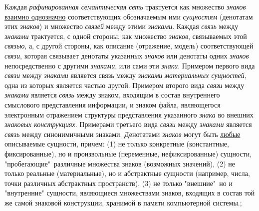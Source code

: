 \begin{SCn}
{{\newline
Каждая \textit{рафинированная семантическая сеть} трактуется как множество \textit{знаков} \uline{взаимно однозначно} соответствующих обозначаемым ими \textit{сущностям} (денотатам этих \textit{знаков}) и множество \textit{связей} между этими \textit{знаками}.
\newline
Каждая \textit{связь} между \textit{знаками} трактуется, с одной стороны, как множество \textit{знаков}, связываемых этой \textit{связью}, а, с другой стороны, как описание (отражение, модель) соответствующей \textit{связи}, которая связывает денотаты указанных \textit{знаков} или денотаты одних \textit{знаков} непосредственно с другими \textit{знаками}, или сами эти \textit{знаки}. Примером первого вида \textit{связи} между \textit{знаками} является связь между \textit{знаками} \textit{материальных сущностей}, одна из которых является частью другой. Примером второго вида \textit{связи} между \textit{знаками} является \textit{связь} между знаком, входящим в состав внутреннего смыслового представления информации, и знаком файла, являющегося электронным отражением структуры представления указанного \textit{знака} во внешних \textit{знаковых конструкциях}. Примерами третьего вида \textit{связи} между \textit{знаками} является \textit{связь} между синонимичными знаками.
\newline
Денотатами \textit{знаков} могут быть \uline{любые} описываемые сущности, причем: (1) не только конкретные (константные, фиксированные), но и произвольные (переменные, нефиксированные)  сущности, "пробегающие"\ различные множества знаков (возможных значений), (2) не только реальные (материальные), но и абстрактные сущности (например, числа, точки различных абстрактных пространств), (3) не только "внешние"\, но и "внутренние"{} сущности, являющиеся множествами знаков, входящих в состав той же самой знаковой конструкции, хранимой в памяти компьютерной системы.};
}
\end{SCn}
